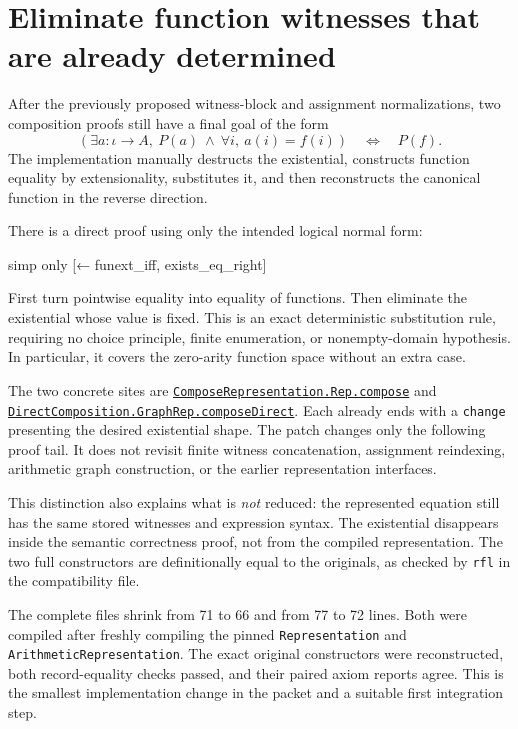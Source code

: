 \documentclass[11pt,letterpaper]{article}
\newcommand{\code}[1]{\nolinkurl{#1}}
\newcommand{\source}[2]{\href{https://github.com/VladimirReshetnikov/ProveIt/blob/efa64ca941cdae37bb6f7fc5093ae8bb69296ca3/Computability/DiophantineConsistency/Lean/DiophantineConsistency/#1.lean}{\code{#1.#2}}}
\begin{document}
\section{Eliminate function witnesses that are already determined}
\label{sec:function}

After the previously proposed witness-block and assignment normalizations, two composition proofs still have a final goal of the form
\begin{equation}
 \left(\exists a:\iota\to A,\ P(a)\ \land\ \forall i,\ a(i)=f(i)\right)
 \quad\Longleftrightarrow\quad P(f).
 \label{eq:function}
\end{equation}
The implementation manually destructs the existential, constructs function equality by extensionality, substitutes it, and then reconstructs the canonical function in the reverse direction.

There is a direct proof using only the intended logical normal form:

\begin{Lean}
  simp only [← funext_iff, exists_eq_right]
\end{Lean}

First turn pointwise equality into equality of functions. Then eliminate the existential whose value is fixed. This is an exact deterministic substitution rule, requiring no choice principle, finite enumeration, or nonempty-domain hypothesis. In particular, it covers the zero-arity function space without an extra case.

The two concrete sites are \source{ComposeRepresentation}{Rep.compose} and \source{DirectComposition}{GraphRep.composeDirect}. Each already ends with a \code{change} presenting the desired existential shape. The patch changes only the following proof tail. It does not revisit finite witness concatenation, assignment reindexing, arithmetic graph construction, or the earlier representation interfaces.

This distinction also explains what is \emph{not} reduced: the represented equation still has the same stored witnesses and expression syntax. The existential disappears inside the semantic correctness proof, not from the compiled representation. The two full constructors are definitionally equal to the originals, as checked by \code{rfl} in the compatibility file.

The complete files shrink from 71 to 66 and from 77 to 72 lines. Both were compiled after freshly compiling the pinned \code{Representation} and \code{ArithmeticRepresentation}. The exact original constructors were reconstructed, both record-equality checks passed, and their paired axiom reports agree. This is the smallest implementation change in the packet and a suitable first integration step.
\end{document}
